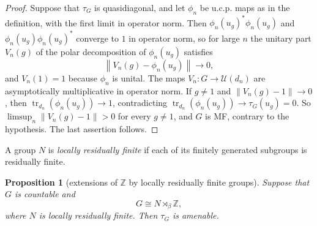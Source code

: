 \documentclass[11pt]{amsart}
\newcommand{\leanverified}[2]{\ignorespaces}
\newtheorem{proposition}[theorem]{Proposition}
\theoremstyle{plain}
\newcommand{\U}{\mathcal U}
\newcommand{\tr}{\operatorname{tr}}
\newcommand{\opnorm}[1]{\left\lVert #1\right\rVert}
\begin{document}
\begin{proof}
Suppose that $\tau_G$ is quasidiagonal, and let $\phi_n$ be u.c.p. maps
as in the definition, with the first limit in operator norm.  Then
$\phi_n(u_g)^*\phi_n(u_g)$ and $\phi_n(u_g)\phi_n(u_g)^*$ converge to
$1$ in operator norm, so for large $n$ the unitary part $V_n(g)$ of the
polar decomposition of $\phi_n(u_g)$ satisfies
\[
 \opnorm{V_n(g)-\phi_n(u_g)}\longrightarrow0,
\]
and $V_n(1)=1$ because $\phi_n$ is unital.  The maps
$V_n\colon G\to\U(d_n)$ are asymptotically multiplicative in operator
norm.  If $g\ne1$ and $\opnorm{V_n(g)-1}\to0$, then
$\tr_{d_n}(\phi_n(u_g))\to1$, contradicting
$\tr_{d_n}(\phi_n(u_g))\to\tau_G(u_g)=0$.  So
$\limsup_n\opnorm{V_n(g)-1}>0$ for every $g\ne1$, and $G$ is MF, contrary
to the hypothesis.  The last assertion follows.
\end{proof}

A group $N$ is \emph{locally residually finite} if each of its finitely
generated subgroups is residually finite.

\begin{proposition}[extensions of $\mathbb Z$ by locally residually finite groups]
\label{prop:locally-rf-by-z-trace}
Suppose that $G$ is countable and
\[
 G\cong N\rtimes_\beta\mathbb Z,
\]
where $N$ is locally residually finite.  Then $\tau_G$ is amenable.
\leanverified{Analysis/LocallyRFByIntFactorization}{GroupApproximation.LocallyRFByIntFactorization.canonicalMaximalTrace_isAmenableTrace_of_locallyRFByInt}
\end{proposition}
\end{document}

